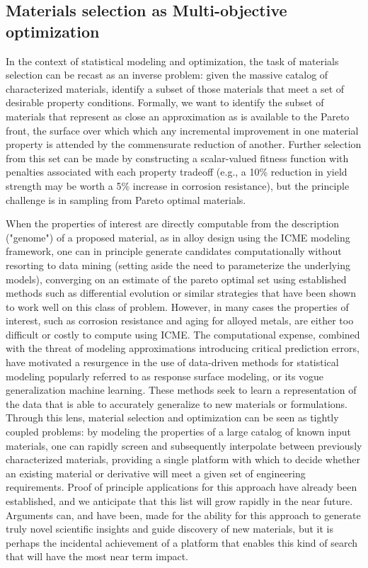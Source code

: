 \subsection{Materials selection as Multi-objective optimization}
In the context of statistical modeling and optimization, the task of materials selection can be recast as an inverse problem: given the massive catalog of characterized materials, identify a subset of those materials that meet a set of desirable property conditions.
Formally, we want to identify the subset of materials that represent as close an approximation as is available to the Pareto front\cite{Sirisalee2004,Fonseca1993}, the surface over which which any incremental improvement in one material property is attended by the commensurate reduction of another. 
Further selection from this set can be made by constructing a scalar-valued fitness function with penalties associated with each property tradeoff (e.g., a 10\% reduction in yield strength may be worth a 5\% increase in corrosion resistance), but the principle challenge is in sampling from Pareto optimal materials.

When the properties of interest are directly computable from the description ("genome") of a proposed material, as in alloy design using the ICME modeling framework, one can in principle generate candidates computationally without resorting to data mining (setting aside the need to parameterize the underlying models), converging on an estimate of the pareto optimal set using established methods such as differential evolution or similar strategies that have been shown to work well on this class of problem\cite{Zhang2015}.
However, in many cases the properties of interest, such as corrosion resistance and aging for alloyed metals\cite{Konter2016}, are either too difficult or costly to compute using ICME. 
The computational expense, combined with the threat of modeling approximations introducing critical prediction errors, have motivated a resurgence in the use of data-driven methods for statistical modeling popularly referred to as response surface modeling, or its vogue generalization machine learning\cite{Rajan2013,Agrawal2014,Suh2006,Jee2000}.
These methods seek to learn a representation of the data that is able to accurately generalize to new materials or formulations. 
Through this lens, material selection and optimization can be seen as tightly coupled problems: by modeling the properties of a large catalog of known input materials, one can rapidly screen and subsequently interpolate between previously characterized materials, providing a single platform with which to decide whether an existing material or derivative will meet a given set of engineering requirements.
Proof of principle applications for this approach have already been established\cite{Sparks2015,Agrawal2014}, and we anticipate that this list will grow rapidly in the near future.
Arguments can, and have been\cite{Rajan2005,Hemanth2011}, made for the ability for this approach to generate truly novel scientific insights and guide discovery of new materials, but it is perhaps the incidental achievement of a platform that enables this kind of search that will have the most near term impact.

